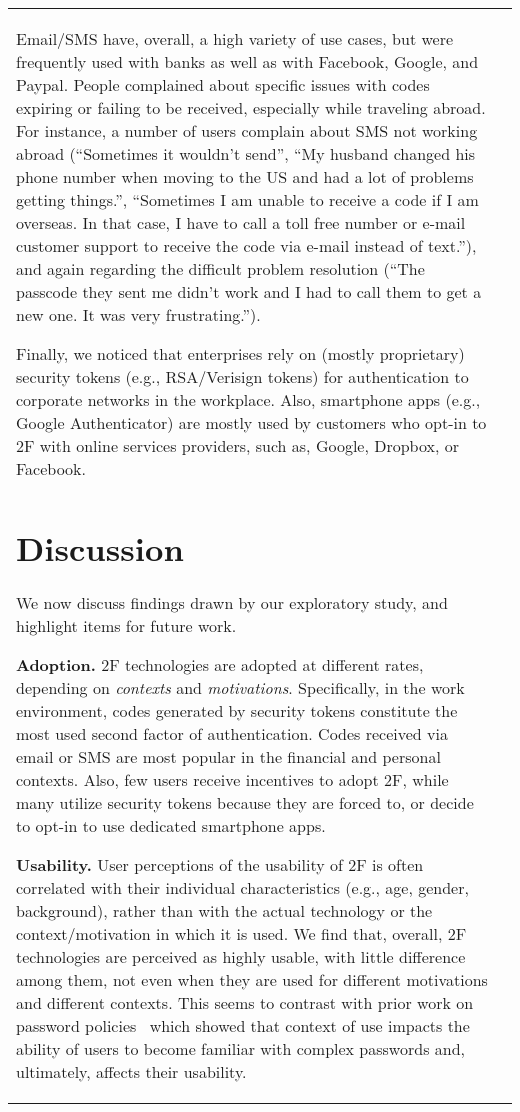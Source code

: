 \documentclass[conference]{IEEEtran}
\newcommand{\descr}[1]{\vspace{0.25cm} \noindent \textbf{#1}}
\begin{document}
\begin{table}[ttt]
\begin{tabular}{|l r|}
Email/SMS have, overall, a high variety of use cases, but were frequently used with banks as well as with Facebook, Google, and Paypal. People complained about specific issues with codes expiring or failing to be received, especially while traveling abroad. For instance, a number of users complain about SMS not working abroad (``Sometimes it wouldn't send'', ``My husband changed his phone number when moving to the US and had a lot of problems getting things.'', ``Sometimes I am unable to receive a code if I am overseas. In that case, I have to call a toll free number or e-mail customer support to receive the code via e-mail instead of text.''), and again regarding the difficult problem resolution (``The passcode they sent me didn't work and I had to call them to get a new one. It was very frustrating.''). 

Finally, we noticed that enterprises rely on (mostly proprietary) security tokens (e.g., RSA/Verisign tokens) for authentication to corporate networks in the workplace. Also, smartphone apps (e.g., Google Authenticator) are mostly used by customers who opt-in to 2F with online services providers, such as, Google, Dropbox, or Facebook.



\section{Discussion}\label{sec:discussion}



We now discuss findings drawn by our exploratory study, and highlight items for future work.

\descr{Adoption.} 2F technologies are adopted at different rates, depending on {\em contexts} and {\em motivations}. Specifically, in the work environment, codes generated by security tokens constitute the most used second factor of authentication. Codes received via email or SMS are most popular in the financial and personal contexts. Also, few users receive incentives to adopt 2F, while many utilize security tokens because they are forced to, or decide to opt-in to use dedicated smartphone apps. 

\descr{Usability.} User perceptions of the usability of 2F is often correlated with their individual characteristics (e.g., age, gender, background), rather than with the actual technology or the context/motivation in which it is used. We find that, overall, 2F technologies are perceived as highly usable, with little difference among them, not even when they are used for different motivations and different contexts. This seems to  contrast with prior work on password policies~\cite{inglesant2010true}
which showed that context of use impacts the ability of users to become 
familiar with complex passwords and, ultimately, affects their usability.


\end{tabular}
\end{table}
\end{document}
